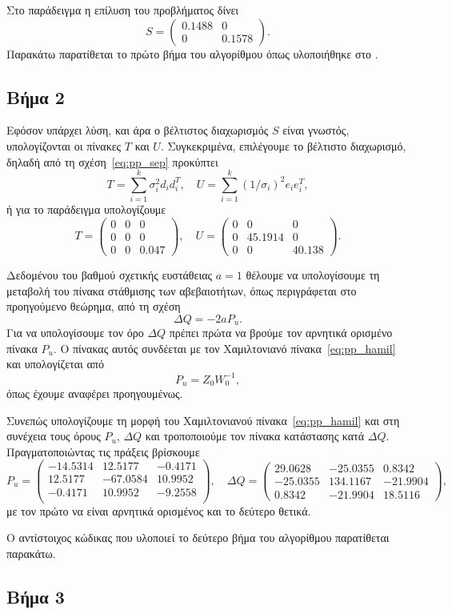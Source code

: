 Στο παράδειγμα η επίλυση του προβλήματος  δίνει
\[
    S =
    \begin{pmatrix}
        0.1488 & 0 \\
        0 & 0.1578
    \end{pmatrix}.
\]
Παρακάτω παρατίθεται το πρώτο βήμα του αλγορίθμου όπως υλοποιήθηκε στο
.
\eng{}

\subsection{Βήμα 2}
Εφόσον υπάρχει λύση, και άρα ο βέλτιστος διαχωρισμός \( S \) είναι
γνωστός, υπολογίζονται οι πίνακες \( T \) και \( U \). Συγκεκριμένα, επιλέγουμε
το βέλτιστο διαχωρισμό, δηλαδή από τη σχέση~\eqref{eq:pp_sep} προκύπτει
\[
  T = \sum_{i = 1}^k \sigma_i^2 d_id_i^T, \quad
  U = \sum_{i = 1}^k (1/\sigma_i)^2 e_ie_i^T,
\]
ή για το παράδειγμα υπολογίζουμε
\[
    T =
    \begin{pmatrix}
        0 & 0 & 0 \\
        0 & 0 & 0 \\
        0 & 0 & 0.047
    \end{pmatrix}, \quad
    U =
    \begin{pmatrix}
        0 & 0 & 0 \\
        0 & 45.1914 & 0 \\
        0 & 0 & 40.138
    \end{pmatrix}.
\]

Δεδομένου του βαθμού σχετικής ευστάθειας \( a = 1 \) θέλουμε να υπολογίσουμε τη
μεταβολή του πίνακα στάθμισης των αβεβαιοτήτων, όπως περιγράφεται στο
προηγούμενο θεώρημα, από τη σχέση
\[
    \Delta Q = -2aP_u.
\]
Για να υπολογίσουμε τον όρο \( \Delta Q \) πρέπει πρώτα να βρούμε τον αρνητικά
ορισμένο πίνακα \( P_u \). Ο πίνακας αυτός συνδέεται με τον Χαμιλτονιανό
πίνακα~\eqref{eq:pp_hamil} και υπολογίζεται από
\[
    P_u = Z_0 W_0^{-1},
\]
όπως έχουμε αναφέρει προηγουμένως.

Συνεπώς υπολογίζουμε τη μορφή  του Χαμιλτονιανού
πίνακα~\eqref{eq:pp_hamil} και στη συνέχεια τους όρους \( P_u \), \( \Delta
Q \) και τροποποιούμε τον πίνακα κατάστασης κατά \( \Delta Q \).
Πραγματοποιώντας τις πράξεις βρίσκουμε
\[
    P_u =
    \begin{pmatrix}
        -14.5314 & 12.5177 & -0.4171 \\
        12.5177 & -67.0584 & 10.9952 \\
        -0.4171 & 10.9952 & -9.2558 \\
    \end{pmatrix}, \quad
    \Delta Q =
    \begin{pmatrix}
        29.0628 & -25.0355 & 0.8342 \\
        -25.0355 & 134.1167 & -21.9904 \\
        0.8342 & -21.9904 & 18.5116
    \end{pmatrix},
\]
με τον πρώτο να είναι αρνητικά ορισμένος και το δεύτερο θετικά.

Ο αντίστοιχος κώδικας  που υλοποιεί το δεύτερο βήμα του αλγορίθμου
παρατίθεται παρακάτω.
\eng{}

\subsection{Βήμα 3}
